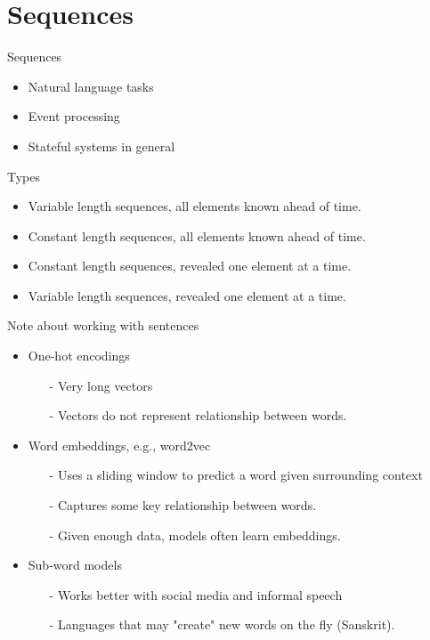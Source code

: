 \section{Sequences}

\begin{frame}{Sequences} 
			\begin{itemize}
				\item Natural language tasks 
				\item Event processing  
				\item Stateful systems in general
			\end{itemize}	
		\begin{block}{Types}
			\begin{itemize}
				\item Variable length sequences, all elements known ahead of time. 
				\item Constant length sequences, all elements known ahead of time. 
				\item Constant length sequences, revealed one element at a time.
				\item Variable length sequences, revealed one element at a time.
			\end{itemize}
		\end{block}

\end{frame}

\begin{frame}{Note about working with sentences}
\begin{itemize}
	\item One-hot encodings
		\begin{itemize}
			\item[-] Very long vectors 
			\item[-] Vectors do not represent relationship between words.
		\end{itemize} 
	\item Word embeddings, e.g., word2vec  
	\begin{itemize}
		\item[-] Uses a sliding window to predict a word given surrounding context
		\item[-] Captures some key relationship between words. 
		\item[-] Given enough data, models often learn embeddings.  
	\end{itemize}
	\item Sub-word models 
		\begin{itemize}
			\item[-] Works better with social media and informal speech
			\item[-] Languages that may "create" new words on the fly (Sanskrit).
		\end{itemize} 
\end{itemize}
\end{frame}

